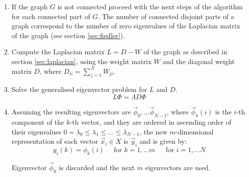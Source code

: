 \documentclass[a4paper, 11pt]{article}
\begin{document}
\begin{enumerate}
\begin{multicols}{2}
\begin{enumerate}
	\columnbreak
	\item \textbf{Simple} \label{itm:simple}
	\begin{equation}
		W_{ij} = 1
	\end{equation}

	\end{enumerate}
	\end{multicols}


	\item If the graph $G$ is not connected proceed with the next steps of the algorithm for each connected part of $G$. The number of connected disjoint parts of a graph correspond to the number of zero eigenvalues of the Laplacian matrix of the graph (see section \ref{sec:fiedler}).
	
	\item Compute the Laplacian matrix $L = D - W$ of the graph as described in section \ref{sec:laplacian}, using the weight matrix $W$ and the diagonal weight matrix $D$, where $D_{ii} = \sum_{j=1}^N W_{ji}$.


	\item Solve the generalised eigenvector problem for $L$ and 	$D$.
	\begin{equation} \label{eq:gen_eig1}
	L\Phi = \Lambda D \Phi
	\end{equation}
	
\item Assuming the resulting eigenvectors are $\vec{\phi}_0, \dots \vec{\phi}_{N-1}$, where  $\vec{\phi}_{k}(i)$ is the $i$-th component of the $k$-th vector, and they are ordered in ascending order of their eigenvalues $0=\lambda_0 \leq \lambda_1 \leq \dots \leq \lambda_{N-1}$, the new $m$-dimensional representation of each vector $\vec{x}_i \in X$ is $\vec{y}_i$ and is given by:	
	\begin{equation}
	y_{i}(k) = \phi_{k}(i) \quad \text{ for } k = 1, \dots m\ \quad \text{ for } i = 1, \dots N
	\end{equation} 

Eigenvector $\vec{\phi}_0$ is discarded and the next $m$ eigenvectors are used.
\end{enumerate}
\end{document}
